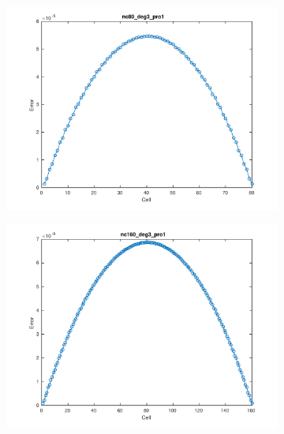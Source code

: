 \documentclass[11pt,a4paper]{article}
\theoremstyle{plain}
\theoremstyle{definition}
\begin{document}
\begin{figure}[H]
\medskip
\begin{subfigure}[b]{0.48\textwidth}
\includegraphics[width=\linewidth]{../../tests_01_01/test_01_01_test9_pro1/output/plots/nc80_deg3_wei111_pro1.pdf}
\end{subfigure}\hspace*{\fill}
\begin{subfigure}[b]{0.48\textwidth}
\includegraphics[width=\linewidth]{../../tests_01_01/test_01_01_test9_pro1/output/plots/nc160_deg3_wei111_pro1.pdf}
\end{subfigure}


\end{figure}
\end{document}
